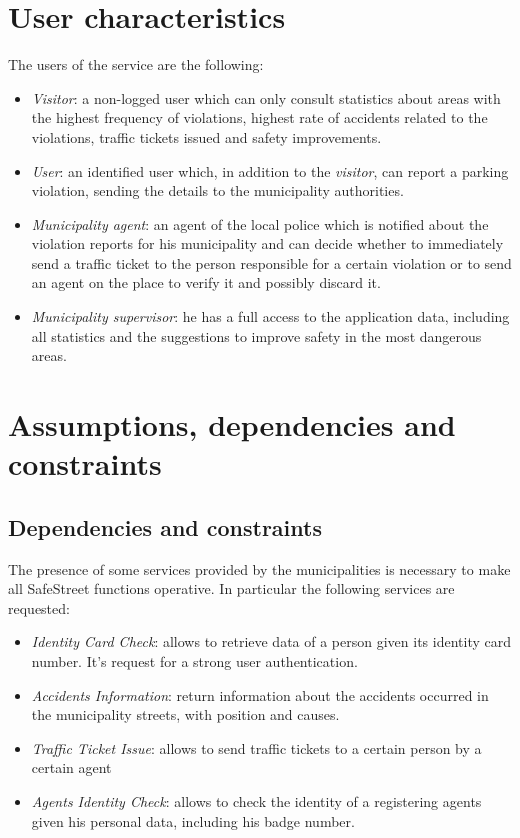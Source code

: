 \documentclass[a4paper]{report}
\begin{document}
\section{User characteristics}
The users of the service are the following:
\begin{itemize}
\item \textit{Visitor}: a non-logged user which can only consult statistics about areas with the highest frequency of violations, highest rate of accidents related to the violations, traffic tickets issued and safety improvements. 
\item \textit{User}: an identified user which, in addition to the \textit{visitor}, can report a parking violation, sending the details to the municipality authorities.
\item \textit{Municipality agent}: an agent of the local police which is notified about the violation reports for his municipality and can decide whether to immediately send a traffic ticket to the person responsible for a certain violation or to send an agent on the place to verify it and possibly discard it.
\item \textit{Municipality supervisor}: he has a full access to the application data, including all statistics and the suggestions to improve safety in the most dangerous areas.
\end{itemize}
\section{Assumptions, dependencies and constraints}
\subsection{Dependencies and constraints}
\label{SS-Dep&Const} 
The presence of some services provided by the municipalities is necessary to make all SafeStreet functions operative. In particular the following services are requested:
\begin{itemize}
\item \textit{Identity Card Check}: allows to retrieve data of a person given its identity card number.  It's request for a strong user authentication.
\item \textit{Accidents Information}: return information about the accidents occurred in the municipality streets, with position and causes.
\item \textit{Traffic Ticket Issue}: allows to send traffic tickets to a certain person by a certain agent
\item \textit{Agents Identity Check}: allows to check the identity of a registering agents given his personal data, including his badge number. 
\end{itemize}
\end{document}
